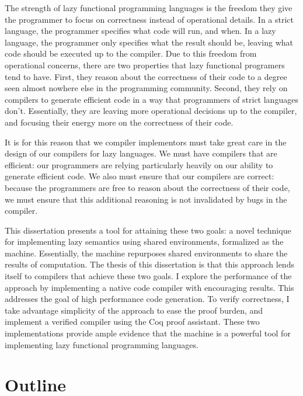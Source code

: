 The strength of lazy functional programming languages is the freedom they give
the programmer to focus on correctness instead of operational details. In a
strict language, the programmer specifies what code will run, and when. In a
lazy language, the programmer only specifies what the result should be, leaving
what code should be executed up to the compiler. Due to this freedom from
operational concerns, there are two properties that lazy functional programers
tend to have. First, they reason about the correctness of their code to a degree
seen almost nowhere else in the programming community.  Second, they rely on
compilers to generate efficient code in a way that programmers of strict
languages don't.  Essentially, they are leaving more operational decisions up to
the compiler, and focusing their energy more on the correctness of their code. 

It is for this reason that we compiler implementors must take great care in the
design of our compilers for lazy languages. We must have compilers that are
efficient: our programmers are relying particularly heavily on our ability to
generate efficient code. We also must ensure that our compilers are correct:
because the programmers are free to reason about the correctness of their code,
we must ensure that this additional reasoning is not invalidated by bugs in the
compiler. 

This dissertation presents a tool for attaining these two goals: a novel
technique for implementing lazy semantics using shared environments, formalized
as the \ce machine. Essentially, the \ce machine repurposes shared environments
to share the results of computation. The thesis of this dissertation is that
this approach lends itself to compilers that achieve these two goals. I explore
the performance of the approach by implementing a native code compiler with
encouraging results. This addresses the goal of high performance code
generation. To verify correctness, I take advantage simplicity of the approach
to ease the proof burden, and implement a verified compiler using the Coq proof
assistant. These two implementations provide ample evidence that the \ce
machine is a powerful tool for implementing lazy functional programming
languages.

\section{Outline}

